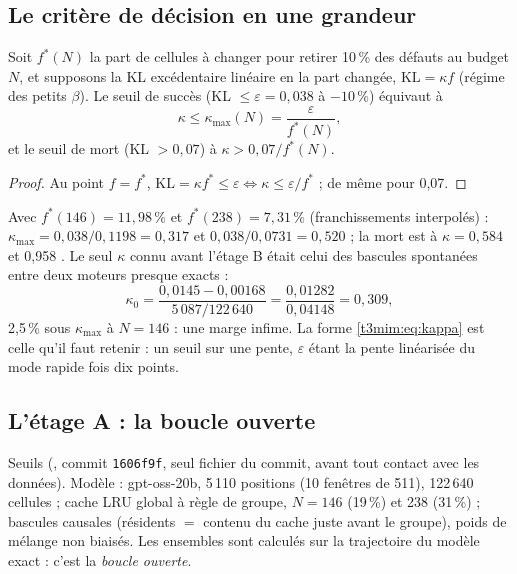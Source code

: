 \subsection{Le critère de décision en une grandeur}\label{t3mim:sec:p3-critere}

\begin{proposition}\label{t3mim:prop:kappa}
Soit $f^\ast(N)$ la part de cellules à changer pour retirer 10\,\% des défauts au budget $N$, et supposons la KL excédentaire linéaire en la part changée, $\mathrm{KL} = \kappa f$ (régime des petits $\beta$). Le seuil de succès (KL $\le \varepsilon = 0{,}038$ à $-10\,\%$) équivaut à
\begin{equation}\label{t3mim:eq:kappa}
\kappa \le \kappa_{\max}(N) = \frac{\varepsilon}{f^\ast(N)},
\end{equation}
et le seuil de mort (KL $> 0{,}07$) à $\kappa > 0{,}07/f^\ast(N)$.
\end{proposition}
\begin{proof}
Au point $f = f^\ast$, $\mathrm{KL} = \kappa f^\ast \le \varepsilon \iff \kappa \le \varepsilon/f^\ast$ ; de même pour 0,07.
\end{proof}
Avec $f^\ast(146) = 11{,}98\,\%$ et $f^\ast(238) = 7{,}31\,\%$ (franchissements interpolés) : $\kappa_{\max} = 0{,}038/0{,}1198 = 0{,}317$ et $0{,}038/0{,}0731 = 0{,}520$ ; la mort est à $\kappa = 0{,}584$ et 0,958 \calc. Le seul $\kappa$ connu avant l'étage B était celui des bascules spontanées entre deux moteurs presque exacts :
\begin{equation}\label{t3mim:eq:kappa0}
\kappa_0 = \frac{0{,}0145 - 0{,}00168}{5\,087/122\,640} = \frac{0{,}01282}{0{,}04148} = 0{,}309 ,
\end{equation}
2,5\,\% sous $\kappa_{\max}$ à $N = 146$ : une marge infime. La forme \eqref{t3mim:eq:kappa} est celle qu'il faut retenir : un seuil sur une pente, $\varepsilon$ étant la pente linéarisée du mode rapide fois dix points.

\subsection{L'étage A : la boucle ouverte}\label{t3mim:sec:p3-etageA}

Seuils (, commit \texttt{1606f9f}, seul fichier du commit, avant tout contact avec les données). Modèle : gpt-oss-20b, 5\,110 positions (10 fenêtres de 511), 122\,640 cellules ; cache LRU global à règle de groupe, $N = 146$ (19\,\%) et 238 (31\,\%) ; bascules causales (résidents $=$ contenu du cache juste avant le groupe), poids de mélange non biaisés. Les ensembles sont calculés sur la trajectoire du modèle exact : c'est la \emph{boucle ouverte}.

